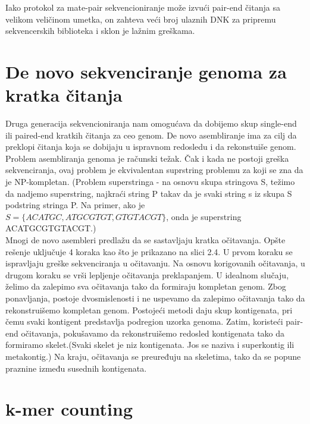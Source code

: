 \documentclass[12pt,oneside]{memoir}
\begin{document}
Iako protokol za mate-pair sekvencioniranje može izvući pair-end čitanja sa velikom veličinom umetka, on zahteva veći broj ulaznih DNK za pripremu sekvencerskih biblioteka i sklon je lažnim greškama.


\section{De novo sekvenciranje genoma za kratka čitanja}

Druga generacija sekvencioniranja nam omogućava da dobijemo skup single-end ili paired-end kratkih čitanja za ceo genom. De novo asembliranje ima za cilj da preklopi čitanja koja se dobijaju u ispravnom redosledu i da rekonstuiše genom.\\


Problem asembliranja genoma je računski težak. Čak i kada ne postoji greška sekvenciranja, ovaj problem je ekvivalentan suprstring problemu za koji se zna da je NP-kompletan. (Problem superstringa - na osnovu skupa stringova S, težimo da nadjemo superstring, najkraći string P takav da je svaki string s iz skupa S podstring stringa P. Na primer, ako je $S = \{ACATGC, ATGCGTGT, GTGTACGT\}$, onda je superstring ACATGCGTGTACGT.) \\

Mnogi de novo asembleri predlažu da se sastavljaju kratka očitavanja. Opšte rešenje uključuje 4 koraka kao što je prikazano na slici 2.4. U prvom koraku se ispravljaju greške sekvenciranja u očitavanju. Na osnovu korigovanih očitavanja, u drugom koraku se vrši lepljenje očitavanja preklapanjem. U idealnom slučaju, želimo da zalepimo sva očitavanja tako da formiraju kompletan genom. Zbog ponavljanja, postoje dvosmislenosti i ne uspevamo da zalepimo očitavanja tako da rekonstruišemo kompletan genom. Postojeći metodi daju skup kontigenata, pri čemu svaki kontigent predstavlja podregion uzorka genoma. Zatim, koristeći pair-end očitavanja, pokušavamo da rekonstruišemo redosled kontigenata tako da formiramo skelet.(Svaki skelet je niz kontigenata. Jos se naziva i superkontig ili metakontig.) Na kraju, očitavanja se preuređuju na skeletima, tako da se popune praznine između susednih kontigenata.\\

\section{k-mer counting}
\end{document}
